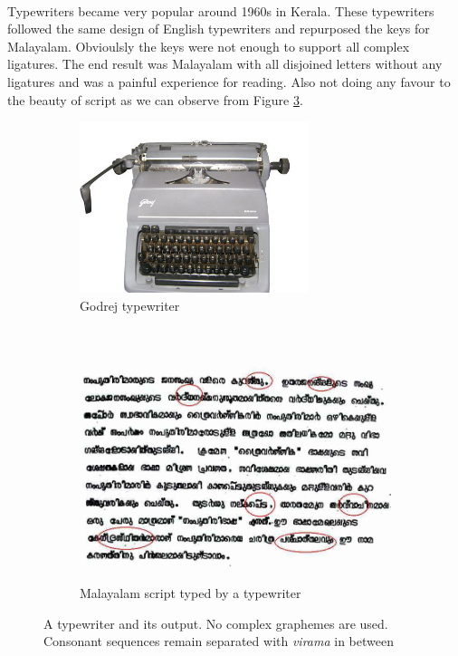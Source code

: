 \documentclass[10pt]{article}
\begin{document}
\paragraph{}
Typewriters became very popular around 1960s in Kerala. These typewriters followed the same design of English typewriters and repurposed the keys for Malayalam. Obvioulsly the keys were not enough to support all complex ligatures. The end result was Malayalam with all disjoined letters without any ligatures and was a painful experience for reading. Also not doing any favour to the beauty of script as we can observe from Figure \ref{typewriter}.

\begin{figure}[h!]
	\centering
	\begin{subfigure}{.7\textwidth}
		\centering
		\includegraphics[width=\linewidth, height=5cm]{images/godrej-typewriter.jpg}
		\caption{Godrej typewriter}
		\label{godrej}
	\end{subfigure}%
	\\
	\begin{subfigure}{\textwidth}
		\centering
		\includegraphics[width=\linewidth,height=6.5cm]{images/typewritertext4.jpg}
		\caption{Malayalam script typed by a typewriter}
		\label{typewritertext}
	\end{subfigure}
	\caption{A typewriter and its output. No complex graphemes are used. Consonant sequences remain separated with \textit{virama} in between}
	\label{typewriter}
\end{figure}
\end{document}
